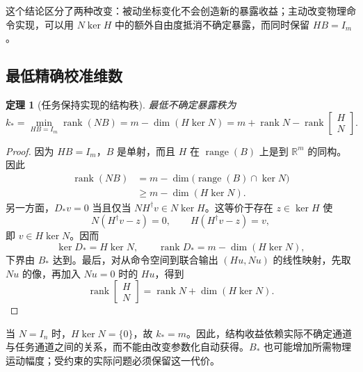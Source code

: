 \documentclass[11pt,a4paper]{article}
\numberwithin{equation}{section}
\newtheorem{theorem}{定理}[section]
\theoremstyle{definition}
\begin{document}
这个结论区分了两种改变：被动坐标变化不会创造新的暴露收益；主动改变物理命令实现，可以用 $N\ker H$ 中的额外自由度抵消不确定暴露，而同时保留 $HB=I_m$。

\subsection{最低精确校准维数}

\begin{theorem}[任务保持实现的结构秩]
\label{thm:cal-rank}
最低不确定暴露秩为
\begin{equation}
  \boxed{
  k_*=
  \min_{HB=I_m}\operatorname{rank}(NB)
  =m-\dim(H\ker N)
  =m+\operatorname{rank}N-
  \operatorname{rank}
  \begin{bmatrix}H\\N\end{bmatrix}.}
  \label{eq:cal-kstar}
\end{equation}
\end{theorem}

\begin{proof}
因为 $HB=I_m$，$B$ 是单射，而且 $H$ 在 $\operatorname{range}(B)$ 上是到 $\mathbb R^m$ 的同构。因此
\begin{align}
  \operatorname{rank}(NB)
  &=m-\dim\big(\operatorname{range}(B)\cap\ker N\big)\\
  &\ge m-\dim(H\ker N).
  \label{eq:cal-rank-lower}
\end{align}
另一方面，$D_*v=0$ 当且仅当 $NH^\dagger v\in N\ker H$。这等价于存在 $z\in\ker H$ 使
\begin{equation}
  N(H^\dagger v-z)=0,\qquad
  H(H^\dagger v-z)=v ,
\end{equation}
即 $v\in H\ker N$。因而
\begin{equation}
  \ker D_*=H\ker N,\qquad
  \operatorname{rank}D_*=m-\dim(H\ker N),
\end{equation}
下界由 $B_*$ 达到。最后，对从命令空间到联合输出 $(Hu,Nu)$ 的线性映射，先取 $Nu$ 的像，再加入 $Nu=0$ 时的 $Hu$，得到
\begin{equation}
  \operatorname{rank}
  \begin{bmatrix}H\\N\end{bmatrix}
  =\operatorname{rank}N+\dim(H\ker N).
\end{equation}
\end{proof}

当 $N=I_n$ 时，$H\ker N=\{0\}$，故 $k_*=m$。因此，结构收益依赖实际不确定通道与任务通道之间的关系，而不能由改变参数化自动获得。$B_*$ 也可能增加所需物理运动幅度；受约束的实际问题必须保留这一代价。
\end{document}
